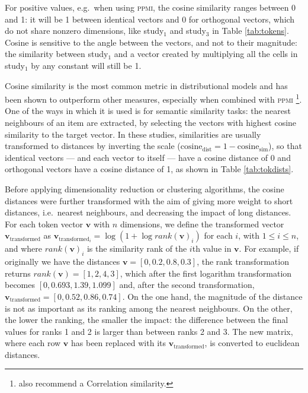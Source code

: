 \documentclass[
]{book}
\begin{document}
For positive values, e.g.~when using \textsc{ppmi}, the cosine similarity ranges between 0 and 1: it will be 1 between identical vectors and 0 for orthogonal vectors, which do not share nonzero dimensions, like study\(_1\) and study\(_3\) in Table \ref{tab:tokens}. Cosine is sensitive to the angle between the vectors, and not to their magnitude: the similarity between study\(_1\) and a vector created by multiplying all the cells in study\(_1\) by any constant will still be 1.

Cosine similarity is the most common metric in distributional models \autocite[105]{jurafsky.martin_2020} and has been shown to outperform other measures, especially when combined with \textsc{ppmi} \autocite{kiela.clark_2014,lapesa.evert_2014,bullinaria.levy_2007}\footnote{\textcite{kiela.clark_2014} also recommend a Correlation similarity.}. One of the ways in which it is used is for semantic similarity tasks: the nearest neighbours of an item are extracted, by selecting the vectors with highest cosine similarity to the target vector. In these studies, similarities are usually transformed to distances by inverting the scale (\(\mathrm{cosine}_{\mathrm{dist}} = 1- \mathrm{cosine}_{\mathrm{sim}}\)), so that identical vectors --- and each vector to itself --- have a cosine distance of 0 and orthogonal vectors have a cosine distance of 1, as shown in Table \ref{tab:tokdists}.

Before applying dimensionality reduction or clustering algorithms, the cosine distances were further transformed with the aim of giving more weight to short distances, i.e.~nearest neighbours, and decreasing the impact of long distances. For each token vector \(\mathbf{v}\) with \(n\) dimensions, we define the transformed vector \(\mathbf{v}_{\mathrm{transformed}}\) as \(\mathbf{v}_{\mathrm{transformed}_i} = \log (1 + \log rank(\mathbf{v})_i)\) for each \(i\), with \(1 \le i \le n\), and where \(rank(\mathbf{v})_i\) is the similarity rank of the \(i\)th value in \(\mathbf{v}\). For example, if originally we have the distances \(\mathbf{v} = [0, 0.2, 0.8, 0.3]\), the rank transformation returns \(rank(\mathbf{v}) = [1, 2, 4, 3]\), which after the first logarithm transformation becomes \([0, 0.693, 1.39, 1.099]\) and, after the second transformation, \(\mathbf{v}_{\mathrm{transformed}} = [0, 0.52, 0.86, 0.74]\). On the one hand, the magnitude of the distance is not as important as its ranking among the nearest neighbours. On the other, the lower the ranking, the smaller the impact: the difference between the final values for ranks 1 and 2 is larger than between ranks 2 and 3.
The new matrix, where each row \(\mathbf{v}\) has been replaced with its \(\mathbf{v}_{\mathrm{transformed}}\), is converted to euclidean distances.
\end{document}
